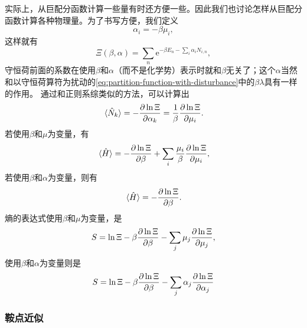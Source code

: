 \documentclass[hyperref, UTF8, a4paper]{ctexart}
\newcommand*{\ee}{\mathrm{e}}
\begin{document}
实际上，从巨配分函数计算一些量有时还方便一些。因此我们也讨论怎样从巨配分函数计算各种物理量。为了书写方便，我们定义
\begin{equation}
    \alpha_i = - \beta \mu_i,
\end{equation}
这样就有
\begin{equation}
    \Xi(\beta, \alpha) = \sum_n \ee^{-\beta E_n - \sum_i \alpha_i N_{i,n}},
\end{equation}
守恒荷前面的系数在使用$\beta$和$\alpha$（而不是化学势）表示时就和$\beta$无关了；这个$\alpha$当然和以守恒荷算符为扰动的\eqref{eq:partition-function-with-disturbance}中的$\beta\lambda$具有一样的作用。
通过和正则系综类似的方法，可以计算出
\begin{equation}
    \expval*{\hat{N}_k} = - \pdv{\ln \Xi}{\alpha_k} = \frac{1}{\beta} \pdv{\ln \Xi}{\mu_i}.
    \label{eq:expectation-of-charge-grand}
\end{equation}
若使用$\beta$和$\mu$为变量，有
\begin{equation}
    \expval*{\hat{H}} = - \pdv{\ln \Xi}{\beta} + \sum_i \frac{\mu_i}{\beta} \pdv{\ln \Xi}{\mu_i},
\end{equation}
若使用$\beta$和$\alpha$为变量，则有
\begin{equation}
    \expval*{\hat{H}} = - \pdv{\ln \Xi}{\beta}.
    \label{eq:expactation-of-energy-grand}
\end{equation}
熵的表达式使用$\beta$和$\mu$为变量，是
\begin{equation}
    S = \ln \Xi - \beta \pdv{\ln \Xi}{\beta} - \sum_j \mu_j \pdv{\ln \Xi}{\mu_j},
    \label{eq:entropy-mu-beta}
\end{equation}
使用$\beta$和$\alpha$为变量则是
\begin{equation}
    S = \ln \Xi - \beta \pdv{\ln \Xi}{\beta} - \sum_j \alpha_j \pdv{\ln \Xi}{\alpha_j}
\end{equation}

\subsubsection{鞍点近似}
\end{document}
